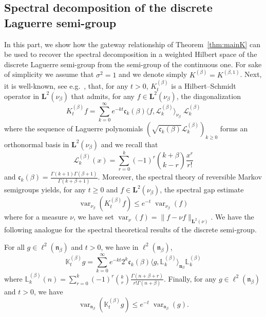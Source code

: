 \documentclass[AHL,Unicode,longabstracts]{cedram}
\DeclareMathOperator{\var}{var}
\newcommand{\fn}{\mathfrak{n}}
\newcommand{\Ls}{K}
\newcommand{\esL}{\mathbf{L}}
\newcommand{\esLd}{\ell}
\renewcommand{\L}{\mathbf{L}}
\newcommand{\meKp}{{\mathbf{n}_{\beta}}}
\newcommand{\discret}[1]{\mathds{#1}}
\newcommand{\cont}[1]{{#1}}
\newcommand{\Ks}{\discret{K}}
\newcommand{\eigL}{\mathbb{L}_k}
\newcommand{\Lnu}{{\L^{2}(\nu_{\beta})}}
\begin{document}
\subsection{Spectral decomposition of the discrete Laguerre semi-group} \label{sec:spect_lag}

In this part, we show how the gateway relationship of Theorem~\ref{thm:mainK} can be used to recover the spectral decomposition in a weighted Hilbert space of the discrete Laguerre semi-group from the semi-group of the continuous one. For sake of simplicity we assume that $\sigma^2=1$ and we denote simply $\Ls^{(\beta)}=\Ls^{(\beta,1)}$. Next, it is well-known, see e.g.~\cite{Bakry_Book}, that, for any $t>0$, $\Ls_t^{(\beta)}$ is a Hilbert--Schmidt operator in $\esL^2(\nu_{\beta})$ that admits, for any $f \in \esL^2(\nu_{\beta})$, the diagonalization
\begin{equation}\label{eq:seK}
\Ls^{(\beta)}_t f = \sum_{k=0}^{\infty}e^{-k t} \mathfrak{c}_{k}(\beta) \langle f, \mathcal{L}^{(\beta)}_k \rangle_{\nu_{\beta}}\; \mathcal{L}^{(\beta)}_k
\end{equation}
where the sequence of Laguerre polynomials $(\sqrt{\mathfrak{c}_{k}(\beta)}\mathcal{L}^{(\beta)}_k)_{k\geq 0}$ forms an orthonormal basis in $\esL^2(\nu_{\beta})$ and we recall that
\begin{equation*}
\mathcal{L}^{(\beta)}_k(x)=\sum_{r=0}^k (-1)^r \binom{ k +\beta}{k-r} \frac{x^r }{r!}
\end{equation*}
and $\mathfrak{c}_{k}(\beta)=\frac{\Gamma(k+1) \Gamma(\beta+1)}{\Gamma(k+\beta+1)}$. Moreover, the spectral theory of reversible Markov semigroups yields, for any $t\geq 0$ and $f\in \Lnu$, the spectral gap estimate
\begin{equation}\label{eq:inv_Lag}
\var_{\nu_{\beta}}\left(\cont{K}^{(\beta)}_tf\right)\leq e^{-t} \; \var_{\nu_{\beta}}\left(f\right)
\end{equation}
where for a measure $\nu$, we have set $\var_{\nu}\left(f\right)=\|f-\nu f\|_{\L^2(\nu)}$. We have the following analogue for the spectral theoretical results of the discrete semi-group.

\begin{prop}
For all $ g \in \esLd^2(\fn_{\beta}) $ and $t>0$, we have in $ \esLd^2(\fn_{\beta}) $,
\begin{equation*}
\Ks^{(\beta)}_t g = \sum_{k=0}^{\infty}e^{-kt}2^{k}\mathfrak{c}_{k}(\beta) \langle g, \eigL^{(\beta)} \rangle_\meKp \eigL^{(\beta)}
\end{equation*}
where $
\eigL^{(\beta)}(n)=\sum_{r=0}^{k} (-1)^r \binom{ k}{r} \frac{\Gamma(n+\beta+r)}{r! \Gamma(n+\beta)}. $ Finally, for any $ g \in \esLd^2(\fn_{\beta}) $ and $t>0$, we have
\begin{equation*}
\var_{\fn_{\beta}}\left(\discret{K}^{(\beta)}_tg \right)\leq e^{-t} \; \var_{\fn_{\beta}}\left(g\right).
\end{equation*}
\end{prop}
\end{document}
